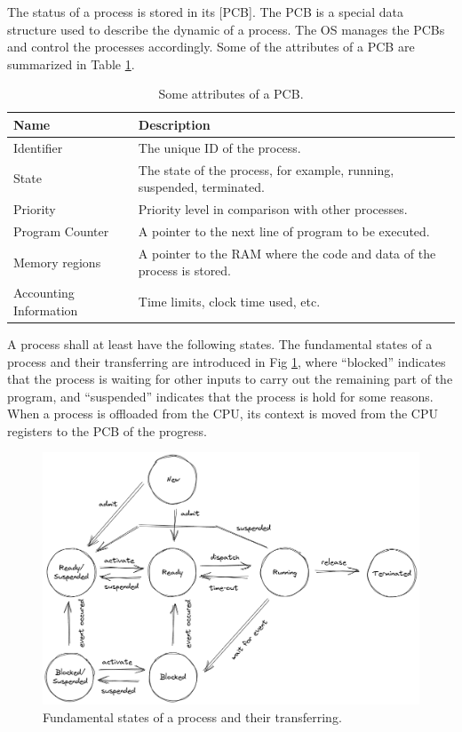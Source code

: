 The status of a process is stored in its [PCB]. The PCB is a special data structure used to describe the dynamic of a process. The OS manages the PCBs and control the processes accordingly. Some of the attributes of a PCB are summarized in Table \ref{ch:pm:tab:pcbcontent}.

\begin{table}[!htb]
	\centering \caption{Some attributes of a PCB.}\label{ch:pm:tab:pcbcontent}
	\begin{tabularx}{\textwidth}{lX}
		\hline
		Name & Description \\ \hline
		Identifier & The unique ID of the process.  \\
		State & The state of the process, for example, running, suspended, terminated.  \\
		Priority & Priority level in comparison with other processes. \\
		Program Counter & A pointer to the next line of program to be executed. \\
		Memory regions & A pointer to the RAM where the code and data of the process is stored. \\
		Accounting Information & Time limits, clock time used, etc. \\ \hline
	\end{tabularx}
\end{table}

A process shall at least have the following states. The fundamental states of a process and their transferring are introduced in Fig \ref{ch:pm:fig:processstatetransfer}, where ``blocked'' indicates that the process is waiting for other inputs to carry out the remaining part of the program, and ``suspended'' indicates that the process is hold for some reasons. When a process is offloaded from the CPU, its context is moved from the CPU registers to the PCB of the progress.

\begin{figure}[!htb]
	\centering
	\includegraphics[width=350pt]{chapters/part-1/figures/processstatetransfer.png}
	\caption{Fundamental states of a process and their transferring.} \label{ch:pm:fig:processstatetransfer}
\end{figure}

